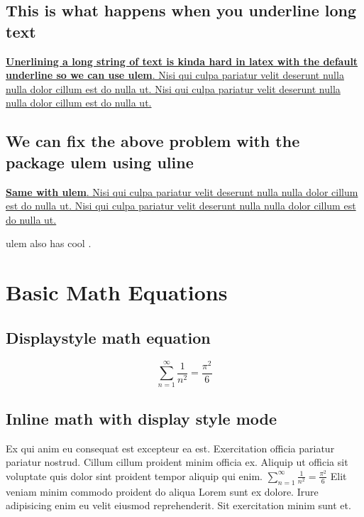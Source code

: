 \documentclass[12pt]{article}
\begin{document}
\subsection{This is what happens when you underline long text}
\underline{\textbf{Unerlining a long string of text is kinda hard in latex with the default underline so we can use ulem}. Nisi qui culpa pariatur velit deserunt nulla nulla dolor cillum est do nulla ut. Nisi qui culpa pariatur velit deserunt nulla nulla dolor cillum est do nulla ut.} \\

\subsection{We can fix the above problem with the package ulem using uline}
\uline{\textbf{Same with ulem}. Nisi qui culpa pariatur velit deserunt nulla nulla dolor cillum est do nulla ut. Nisi qui culpa pariatur velit deserunt nulla nulla dolor cillum est do nulla ut.}

{\large \noindent ulem also has  cool .}



\section{Basic Math Equations}

\subsection{Displaystyle math equation}

\begin{equation} %
    \sum_{n=1}^\infty \frac{1}{n^2} = \frac{\pi^2}{6}
\end{equation}

\subsection{Inline math with display style mode}

Ex qui anim eu consequat est excepteur ea est. Exercitation officia pariatur pariatur nostrud. Cillum cillum proident minim officia ex. Aliquip ut officia sit voluptate quis dolor sint proident tempor aliquip qui enim. $ \displaystyle \sum_{n=1}^\infty \frac{1}{n^2} = \frac{\pi^2}{6} $ Elit veniam minim commodo proident do aliqua Lorem sunt ex dolore. Irure adipisicing enim eu velit eiusmod reprehenderit. Sit exercitation minim sunt et.
\end{document}
